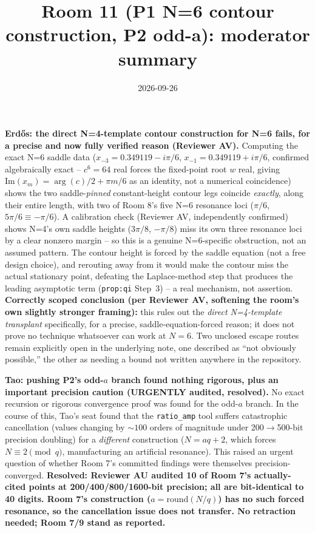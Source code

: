 \documentclass[11pt]{article}
\title{Room 11 (P1 N=6 contour construction, P2 odd-a): moderator summary}
\date{2026-09-26}
\begin{document}
\maketitle

\textbf{Erd\H os: the direct N=4-template contour construction for N=6 fails, for a precise and
now fully verified reason (Reviewer AV).} Computing the exact N=6 saddle data
($x_{-3}=0.349119-i\pi/6$, $x_{-1}=0.349119+i\pi/6$, confirmed algebraically exact -- $c^6=64$
real forces the fixed-point root $w$ real, giving $\mathrm{Im}(x_m)=\arg(c)/2+\pi m/6$ as an
identity, not a numerical coincidence) shows the two saddle-\emph{pinned} constant-height contour
legs coincide \emph{exactly}, along their entire length, with two of Room 8's five N=6 resonance
loci ($\pi/6$, $5\pi/6\equiv-\pi/6$). A calibration check (Reviewer AV, independently confirmed)
shows N=4's own saddle heights ($3\pi/8$, $-\pi/8$) miss its own three resonance loci by a clear
nonzero margin -- so this is a genuine N=6-specific obstruction, not an assumed pattern. The
contour height is forced by the saddle equation (not a free design choice), and rerouting away
from it would make the contour miss the actual stationary point, defeating the Laplace-method step
that produces the leading asymptotic term (\texttt{prop:qi} Step~3) -- a real mechanism, not
assertion. \textbf{Correctly scoped conclusion (per Reviewer AV, softening the room's own slightly
stronger framing):} this rules out the \emph{direct N=4-template transplant} specifically, for a
precise, saddle-equation-forced reason; it does not prove no technique whatsoever can work at
$N=6$. Two unclosed escape routes remain explicitly open in the underlying note, one described as
``not obviously possible,'' the other as needing a bound not written anywhere in the repository.

\textbf{Tao: pushing P2's odd-$a$ branch found nothing rigorous, plus an important precision
caution (URGENTLY audited, resolved).} No exact recursion or rigorous convergence proof was found
for the odd-$a$ branch. In the course of this, Tao's seat found that the \texttt{ratio\_amp} tool
suffers catastrophic cancellation (values changing by $\sim100$ orders of magnitude under 200$\to$500-bit
precision doubling) for a \emph{different} construction ($N=aq+2$, which forces $N\equiv2\pmod q$,
manufacturing an artificial resonance). This raised an urgent question of whether Room 7's
committed findings were themselves precision-converged. \textbf{Resolved: Reviewer AU audited 10 of
Room 7's actually-cited points at 200/400/800/1600-bit precision; all are bit-identical to 40
digits. Room 7's construction ($a=\mathrm{round}(N/q)$) has no such forced resonance, so the
cancellation issue does not transfer. No retraction needed; Room 7/9 stand as reported.}
\end{document}
